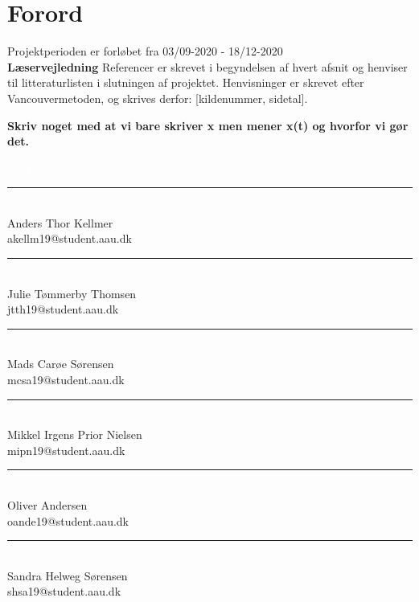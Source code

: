 \section*{Forord}


Projektperioden er forløbet fra 03/09-2020 - 18/12-2020\\

\large\textbf{Læservejledning} \normalsize \newline
Referencer er skrevet i begyndelsen af hvert afsnit og henviser til litteraturlisten i slutningen af projektet. Henvisninger er skrevet efter Vancouvermetoden, og skrives derfor: [kildenummer, sidetal].    

\textbf{Skriv noget med at vi bare skriver x men mener x(t) og hvorfor vi gør det.}
\bigskip

\textcolor{white}{tekst}

\begin{minipage}[L]{0.45\textwidth}
 \centering
 \rule{\textwidth}{0.5pt}\\
  Anders Thor Kellmer\\
 {\footnotesize akellm19@student.aau.dk}
\end{minipage}
\hfill
\begin{minipage}[H]{0.45\textwidth}
 \centering
 \rule{\textwidth}{0.5pt}\\
  Julie Tømmerby Thomsen\\
 {\footnotesize jtth19@student.aau.dk}
\end{minipage}
\vspace{3\baselineskip}


\begin{minipage}[L]{0.45\textwidth}
 \centering
 \rule{\textwidth}{0.5pt}\\
  Mads Carøe Sørensen\\
 {\footnotesize mcsa19@student.aau.dk}
\end{minipage}
\hfill
\begin{minipage}[H]{0.45\textwidth}
 \centering
 \rule{\textwidth}{0.5pt}\\
  Mikkel Irgens Prior Nielsen\\
 {\footnotesize mipn19@student.aau.dk}
\end{minipage}
\vspace{3\baselineskip}


\begin{minipage}[H]{0.45\textwidth}
 \centering
 \rule{\textwidth}{0.5pt}\\
 Oliver Andersen\\
 {\footnotesize oande19@student.aau.dk}
\end{minipage}
\hfill
\begin{minipage}[L]{0.45\textwidth}
 \centering
 \rule{\textwidth}{0.5pt}\\
 Sandra Helweg Sørensen\\
 {\footnotesize shsa19@student.aau.dk}
\end{minipage}

